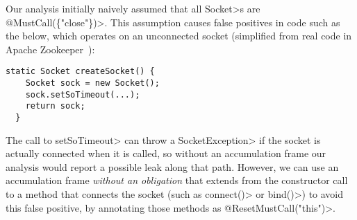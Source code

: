 Our analysis initially naively assumed that all \<Socket>s are
\<@MustCall(\{"close"\})>. This assumption causes false positives
in code such as the below, which operates on an unconnected socket
(simplified from real code in Apache Zookeeper~):

\begin{lstlisting}[frame=tb,belowskip=3mm]
  static Socket createSocket() {
    Socket sock = new Socket();
    sock.setSoTimeout(...);
    return sock;
  }
\end{lstlisting}

The call to \<setSoTimeout> can throw a \<SocketException> if the
socket is actually connected when it is called, so without an
accumulation frame our analysis would report a possible leak along
that path. 
However, we can use an accumulation frame \emph{without an obligation}
that extends from the constructor call to a method that connects the
socket (such as \<connect()> or \<bind()>) to avoid this false positive,
by annotating those methods as \<@ResetMustCall("this")>.
